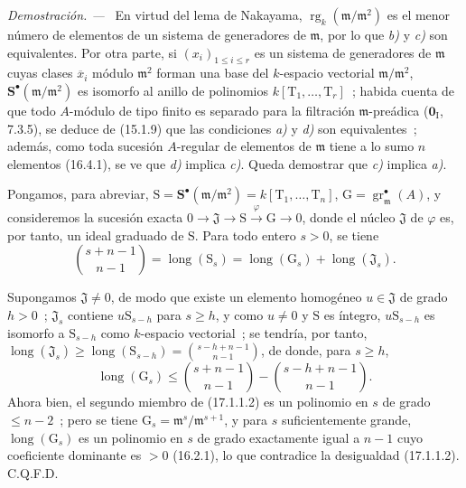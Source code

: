\documentclass[10pt,oneside]{book}
\newcommand{\oldpage}[2][]{%
  \setcounter{footnote}{0}%
  \marginpar{\scriptsize\textbf{#1}~|~#2}\ignorespaces}
\newenvironment{proof}{%
  \par\medskip\noindent\textit{Demostración. ---\ }}{\par}
\providecommand{\setmin}{-}%
\begin{document}
\begin{proof}
En virtud del lema de Nakayama,
$\operatorname{rg}_k(\mathfrak{m}/\mathfrak{m}^2)$ es el menor número de
elementos de un sistema de generadores de $\mathfrak{m}$, por lo que \emph{b)} y \emph{c)} son
equivalentes. Por otra parte, si $(x_i)_{1\leq i\leq r}$ es un sistema de
generadores de $\mathfrak{m}$ cuyas clases $\overline{x}_i$ módulo
$\mathfrak{m}^2$ forman una base del $k$-espacio vectorial
$\mathfrak{m}/\mathfrak{m}^2$, $\mathbf S^\bullet(\mathfrak{m}/\mathfrak{m}^2)$
es isomorfo al anillo de
\oldpage[0\textsubscript{IV-1}]{40}
polinomios $k[\mathrm{T}_1,\ldots,\mathrm{T}_r]$~; habida cuenta de que todo
$A$-módulo de tipo finito es separado para la filtración $\mathfrak{m}$-preádica
($\mathbf{0}_{\mathrm I}$, 7.3.5), se deduce de (15.1.9) que las condiciones \emph{a)} y \emph{d)}
son equivalentes~; además, como toda sucesión $A$-regular de elementos de
$\mathfrak{m}$ tiene a lo sumo $n$ elementos (16.4.1), se ve que \emph{d)} implica \emph{c)}.
Queda demostrar que \emph{c)} implica \emph{a)}.

Pongamos, para abreviar,
$\mathrm{S}=\mathbf S^\bullet(\mathfrak{m}/\mathfrak{m}^2)
=k[\mathrm{T}_1,\ldots,\mathrm{T}_n]$,
$\mathrm{G}=\operatorname{gr}^\bullet_{\mathfrak{m}}(A)$, y consideremos la sucesión
exacta
$0\longrightarrow\mathfrak{J}\longrightarrow\mathrm{S}
\xrightarrow{\varphi}\mathrm{G}\longrightarrow0$, donde el núcleo
$\mathfrak{J}$ de $\varphi$ es, por tanto, un ideal graduado de $\mathrm{S}$. Para
todo entero $s>0$, se tiene
\begin{equation}
\label{0.17.1.1.1-es}
\tag{17.1.1.1}
  \binom{s+n\setmin 1}{n\setmin 1}
  =\operatorname{long}(\mathrm{S}_s)
  =\operatorname{long}(\mathrm{G}_s)
  +\operatorname{long}(\mathfrak{J}_s).
\end{equation}

Supongamos $\mathfrak{J}\neq0$, de modo que existe un elemento homogéneo
$u\in\mathfrak{J}$ de grado $h>0$~; $\mathfrak{J}_s$ contiene
$u\mathrm{S}_{s-h}$ para $s\geq h$, y como $u\neq0$ y $\mathrm{S}$ es
íntegro, $u\mathrm{S}_{s-h}$ es isomorfo a $\mathrm{S}_{s-h}$ como
$k$-espacio vectorial~; se tendría, por tanto,
$\operatorname{long}(\mathfrak{J}_s)\geq
\operatorname{long}(\mathrm{S}_{s-h})=\binom{s\setmin h+n\setmin 1}{n\setmin 1}$, de donde, para
$s\geq h$,
\begin{equation}
\label{0.17.1.1.2-es}
\tag{17.1.1.2}
  \operatorname{long}(\mathrm{G}_s)
  \leq\binom{s+n\setmin 1}{n\setmin 1}\setmin\binom{s\setmin h+n\setmin 1}{n\setmin 1}.
\end{equation}
Ahora bien, el segundo miembro de (17.1.1.2) es un polinomio en $s$ de grado
$\leq n\setmin 2$~; pero se tiene
$\mathrm{G}_s=\mathfrak{m}^s/\mathfrak{m}^{s+1}$, y para $s$ suficientemente grande,
$\operatorname{long}(\mathrm{G}_s)$ es un polinomio en $s$ de grado exactamente
igual a $n\setmin 1$ cuyo coeficiente dominante es $>0$ (16.2.1), lo que contradice
la desigualdad (17.1.1.2). C.Q.F.D.
\end{proof}
\end{document}
